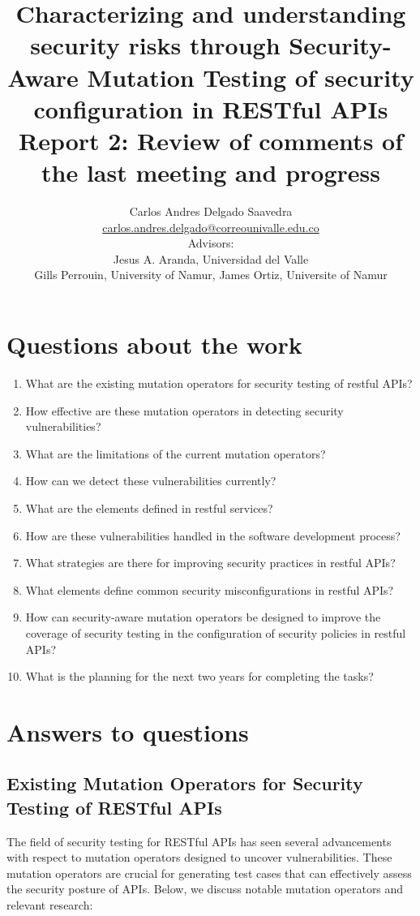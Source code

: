 \documentclass[12pt, letterpaper,twocolumn]{article}
\title{Characterizing and understanding security risks through Security-Aware Mutation Testing of security configuration in RESTful APIs \\
\large{Report 2: Review of comments of the last meeting and progress}}
\author{
    \large{Carlos Andres Delgado Saavedra}\\
    \footnotesize \href{mailto:carlos.andres.delgado@correounivalle.edu.co}{carlos.andres.delgado@correounivalle.edu.co}\\ 
    Advisors:\\
    Jesus A. Aranda, Universidad del Valle \\
    Gills Perrouin, University of Namur,
    James Ortiz, Universite of Namur
    }
\theoremstyle{remark}
\theoremstyle{definition}
\begin{document}
\maketitle

\section{Questions about the work}


\begin{enumerate}
    \item What are the existing mutation operators for security testing of restful APIs?
    \item How effective are these mutation operators in detecting security vulnerabilities?
    \item What are the limitations of the current mutation operators?
    \item How can we detect these vulnerabilities currently?
    \item What are the elements defined in restful services?
    \item How are these vulnerabilities handled in the software development process?
    \item What strategies are there for improving security practices in restful APIs?
    \item What elements define common security misconfigurations in restful APIs?
    \item How can security-aware mutation operators be designed to improve the coverage of security testing in the configuration of security policies in restful APIs?
    \item What is the planning for the next two years for completing the tasks?
\end{enumerate}

\section{Answers to questions}

\subsection{Existing Mutation Operators for Security Testing of RESTful APIs}

The field of security testing for RESTful APIs has seen several advancements with respect to mutation operators designed to uncover vulnerabilities. These mutation operators are crucial for generating test cases that can effectively assess the security posture of APIs. Below, we discuss notable mutation operators and relevant research:
\end{document}
